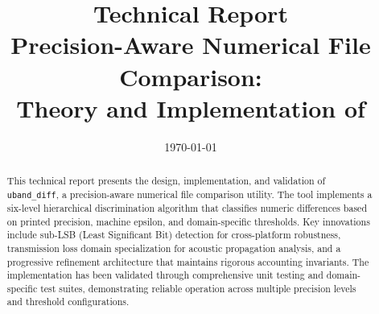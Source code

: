 \documentclass[11pt,letterpaper]{article}
\title{
    \textbf{Technical Report}\\
    \large Precision-Aware Numerical File Comparison:\\
    Theory and Implementation of \ubdiff{}
}
\author{}
\date{\today}
\newcommand{\ubdiff}{\texttt{uband\_diff}}
\begin{document}
\maketitle

\begin{abstract}
This technical report presents the design, implementation, and validation of \ubdiff{}, a precision-aware numerical file comparison utility. The tool implements a six-level hierarchical discrimination algorithm that classifies numeric differences based on printed precision, machine epsilon, and domain-specific thresholds. Key innovations include sub-LSB (Least Significant Bit) detection for cross-platform robustness, transmission loss domain specialization for acoustic propagation analysis, and a progressive refinement architecture that maintains rigorous accounting invariants. The implementation has been validated through comprehensive unit testing and domain-specific test suites, demonstrating reliable operation across multiple precision levels and threshold configurations.
\end{abstract}

\tableofcontents
\newpage











% 
% 

\appendix


\end{document}
